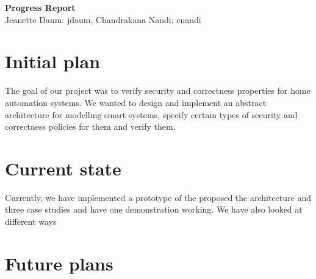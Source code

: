 \documentclass{article}
\begin{document}
\begin{center}
\large \textbf{Progress Report}\\
\normalsize {Jeanette Daum: jdaum, Chandrakana Nandi: cnandi}
\end{center}
\section{Initial plan}
The goal of our project was to verify security and correctness properties for home automation systems. We wanted to design and implement an abstract architecture for modelling smart systems, specify certain types of security and correctness policies for them and verify them. 

\section{Current state}
Currently, we have implemented a prototype of the proposed the architecture and three case studies and have one demonstration working. We have also looked at different ways 
\section{Future plans}
\end{document}
